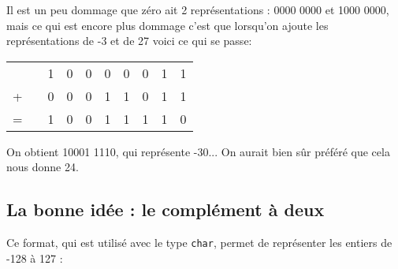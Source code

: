Il est un peu dommage que zéro ait 2 représentations : 0000 0000 et 1000 0000, mais ce qui est encore plus dommage
c'est que lorsqu'on ajoute les représentations de -3 et de 27 voici ce qui se passe:
\begin{center}
    \tabulardefault
    \begin{tabular}{cccccccccc}
          &  & 1 & 0 & 0 & 0 & 0 & 0 & 1 & 1 \\

        + &  & 0 & 0 & 0 & 1 & 1 & 0 & 1 & 1 \\
        \hline
        = &  & 1 & 0 & 0 & 1 & 1 & 1 & 1 & 0 \\
    \end{tabular}

\end{center}

On obtient 10001 1110, qui représente -30... On aurait bien sûr préféré que cela nous donne 24.

\subsection{La bonne idée : le complément à deux}

Ce format, qui est utilisé avec le type \texttt{char}, permet de représenter les entiers de -128 à 127 :

